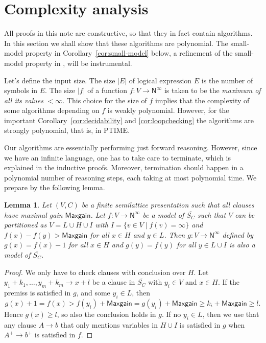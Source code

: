 \documentclass[11pt,a4paper]{article}
\newtheorem{lemma}[theorem]{Lemma}
\newcommand{\N}{\mathsf{N}}
\newcommand\set[1]{\{#1\}}
\newcommand\jbody[3]{{{#1_1}+{#2_1}},\ldots,{{#1_#3}+{#2_#3}}}
\newcommand\Ninf{\N^\infty}
\newcommand\M{\mathsf{Maxgain}}
\newcommand\upS[1]{\overline{S_{#1}}}
\begin{document}
\section{Complexity analysis}\label{sec:complexity}

All proofs in this note are constructive, so that they in fact
contain algorithms. In this section we shall show
that these algorithms are polynomial. 
The small-model property in Corollary~\ref{cor:small-model} below, 
a refinement of the small-model property in \cite{BNR},
will be instrumental.

Let's define the input size. The size $|E|$ of logical expression $E$ is
the number of symbols in $E$. The size $|f|$ of a function $f: V\to\Ninf$
is taken to be the \emph{maximum of all its values} $<\infty$. %
This choice for the size of $f$ implies that the complexity of some
algorithms depending on $f$ is weakly polynomial. 
However, for the important
Corollary~\ref{cor:decidability} and \ref{cor:loopchecking}
the algorithms are strongly polynomial, that is, in PTIME.

Our algorithms are essentially performing just forward reasoning. 
However, since we have an infinite language, one has to take care
to terminate, which is explained in the inductive proofs. 
Moreover, termination should happen in a polynomial number of reasoning
steps, each taking at most polynomial time. We prepare 
by the following lemma.


\begin{lemma}\label{thm:compress-model}
Let  $(V,C)$ be a finite semilattice presentation such that all
clauses have maximal gain $\M$.
Let $f: V\to\Ninf$ be a model of $\upS{C}$ such that $V$ can be
partitioned as $V = L\cup H\cup I$ with $I= \set{v\in V \mid f(v)=\infty}$
and $f(x)-f(y) > \M$ for all $x\in H$ and $y\in L$.
Then $g: V\to\Ninf$ defined by $g(x)=f(x)-1$ for all $x \in H$ and $g(y)=f(y)$
for all $y\in L\cup I$ is also a model of $\upS{C}$.
\end{lemma}
\begin{proof}
We only have to check clauses with conclusion over $H$.
Let $\jbody{y}{k}{m} \to x+l$ be a clause in $\upS{C}$ with $y_i \in V$
and $x\in H$. If the premiss is satisfied in $g$, and some $y_i\in L$, then
\[
g(x)+1 = f(x) > f(y_i)+\M = g(y_i)+\M \geq k_i+\M \geq l.
\]
Hence $g(x)\geq l$, so also the conclusion holds in $g$.
If no $y_i\in L$, then we use that any clause $A\to b$ 
that only mentions variables in $H\cup I$
is satisfied in $g$ when $A^+ \to b^+$ is satisfied in $f$. 
\end{proof}
\end{document}

